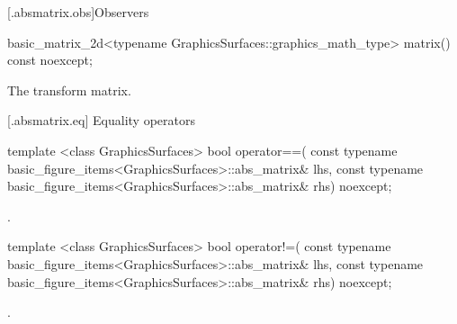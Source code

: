  [\iotwod.absmatrix.obs]{Observers}%

%
\begin{itemdecl}
basic_matrix_2d<typename GraphicsSurfaces::graphics_math_type> matrix() const noexcept;
\end{itemdecl}
\begin{itemdescr}
\pnum
\returns The transform matrix.
\end{itemdescr}

 [\iotwod.absmatrix.eq] {Equality operators}%

%
\begin{itemdecl}
template <class GraphicsSurfaces>
bool operator==(
  const typename basic_figure_items<GraphicsSurfaces>::abs_matrix& lhs,
  const typename basic_figure_items<GraphicsSurfaces>::abs_matrix& rhs)
  noexcept;
\end{itemdecl}
\begin{itemdescr}
\pnum
\returns {}.
\end{itemdescr}

%
\begin{itemdecl}
template <class GraphicsSurfaces>
bool operator!=(
  const typename basic_figure_items<GraphicsSurfaces>::abs_matrix& lhs,
  const typename basic_figure_items<GraphicsSurfaces>::abs_matrix& rhs)
  noexcept;
\end{itemdecl}
\begin{itemdescr}
\pnum
\returns {}.
\end{itemdescr}
